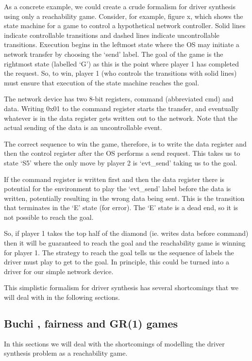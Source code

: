 \documentclass{article}
\newcommand{\buchi}{Buchi }
\begin{document}
As a concrete example, we could create a crude formalism for driver synthesis using only a reachability game. Consider, for example, figure x, which shows the state machine for a game to control a hypothetical network controller. Solid lines indicate controllable transitions and dashed lines indicate uncontrollable transitions. Execution begins in the leftmost state where the OS may initiate a network transfer by choosing the `send' label. The goal of the game is the rightmost state (labelled `G') as this is the point where player 1 has completed the request. So, to win, player 1 (who controls the transitions with solid lines) must ensure that execution of the state machine reaches the goal. 

The network device has two 8-bit registers, command (abbreviated cmd) and data. Writing 0x01 to the command register starts the transfer, and eventually whatever is in the data register gets written out to the network. Note that the actual sending of the data is an uncontrollable event. 

The correct sequence to win the game, therefore, is to write the data register and then the control register after the OS performs a send request. This takes us to state `S5' where the only move by player 2 is `evt\_send' taking us to the goal. 

If the command register is written first and then the data register there is potential for the environment to play the `evt\_send' label before the data is written, potentially resulting in the wrong data being sent. This is the transition that terminates in the `E' state (for error). The `E' state is a dead end, so it is not possible to reach the goal. 

So, if player 1 takes the top half of the diamond (ie. writes data before command) then it will be guaranteed to reach the goal and the reachability game is winning for player 1. The strategy to reach the goal tells us the sequence of labels the driver must play to get to the goal. In principle, this could be turned into a driver for our simple network device.

This simplistic formalism for driver synthesis has several shortcomings that we will deal with in the following sections.

\subsection{\buchi, fairness and GR(1) games}

In this sections we will deal with the shortcomings of modelling the driver synthesis problem as a reachability game.
\end{document}

